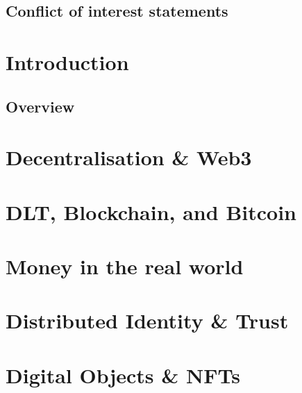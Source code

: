 \documentclass[
	10pt, %
	fleqn, %
	a5paper, %
]{LegrandOrangeBook}
\begin{document}

\chapterspaceabove{6.75cm} %
\chapterspacebelow{7.25cm} %


\section{Conflict of interest statements}

\chapter{Introduction}
\section{Overview}


\chapter{Decentralisation \& Web3}


\chapter{DLT, Blockchain, and Bitcoin}

\chapter{Money in the real world}


%

\chapter{Distributed Identity \& Trust}


\chapter{Digital Objects \& NFTs}

\end{document}
